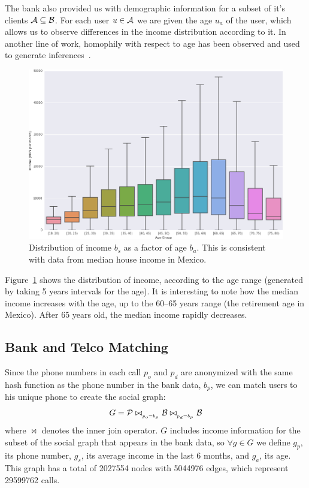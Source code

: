 The bank also provided us with demographic information for a subset of it's clients \( \mathcal{A} \subseteq \mathcal{B} \). For each user \( u \in \mathcal{A} \) we are given the age \( u_a \) of the user, which allows us to observe differences in the income distribution according to it. In another line of work, homophily with respect to age has been observed and used to generate inferences~\cite{brea2014}.

\begin{figure}[h]
\begin{center}
\includegraphics[width=0.95\columnwidth]{figures/income_age_boxplot4/income_age_boxplot4.png}
\caption{Distribution of income $b_s$ as a factor of age $b_a$. This is consistent with data from median house income in Mexico\cite{gallup2013}.}
\label{income_age_boxplot}
\end{center}
\end{figure}

Figure~\ref{income_age_boxplot} shows the distribution of income, according to the age range (generated by taking 5 years intervals for the age).
It is interesting to note how the median income increases with the age, up to
the 60--65 years range (the retirement age in Mexico). After 65 years old, the median income rapidly decreases.


\subsection{Bank and Telco Matching}

Since the phone numbers in each call $ p_o $ and $ p_d $ are anonymized with the same hash function as the phone number in the bank data, $ b_p $, we can match users to his unique phone to create the social graph:
$$ G = \mathcal{P} \bowtie_{_{p_o = b_p}} \mathcal{B} \bowtie_{_{p_d = b_p}} \mathcal{B} $$
where $\bowtie$ denotes the inner join operator.
$G$ includes income information for the subset of the social graph that appears in the bank data, so \( \forall g \in G \) we define \( g_p \), its phone number, \( g_s \), its average income in the last 6 months, and \( g_a \), its age.
This graph has a total of \num{2027554} nodes with \num{5044976} edges, which represent \num{29599762} calls. %

